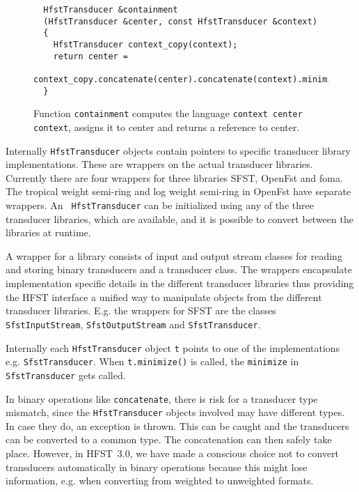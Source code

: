 \documentclass{llncs}
\begin{document}
\begin{figure}
\begin{center}
\begin{verbatim}
  HfstTransducer &containment
  (HfstTransducer &center, const HfstTransducer &context)
  {
    HfstTransducer context_copy(context);
    return center = 
      context_copy.concatenate(center).concatenate(context).minimize();
  }
\end{verbatim}
\caption{Function {\tt containment} computes the language {\tt context center context}, assigns it to center and returns a reference to center.}\label{containment-figure}
\end{center}
\end{figure}

Internally {\tt HfstTransducer} objects contain pointers to specific
transducer library implementations. These are wrappers on the actual
transducer libraries. Currently there are four wrappers for three
libraries SFST, OpenFst and foma. The tropical weight semi-ring and log
weight semi-ring in OpenFst have separate wrappers. An {\tt
  HfstTransducer} can be initialized using any of the three transducer
libraries, which are available, and it is possible to convert between
the libraries at runtime.

A wrapper for a library consists of input and output stream classes
for reading and storing binary transducers and a transducer class. The
wrappers encapsulate implementation specific details in the different
transducer libraries thus providing the HFST interface a unified way
to manipulate objects from the different transducer
libraries. E.g. the wrappers for SFST are the classes {\tt
  SfstInputStream}, {\tt SfstOutputStream} and {\tt SfstTransducer}.

Internally each {\tt HfstTransducer} object {\tt t} points to one of
the implementations e.g. {\tt SfstTransducer}. When {\tt t.minimize()}
is called, the {\tt minimize} in {\tt SfstTransducer} gets called. 

In binary operations like {\tt concatenate}, there is risk for a
transducer type mismatch, since the {\tt HfstTransducer} objects
involved may have different types. In case they do, an exception is
thrown. This can be caught and the transducers can be converted to a
common type. The concatenation can then safely take place. 
However, in HFST~3.0, we have made a conscious choice not to convert transducers
automatically in binary operations because this might lose
information, e.g. when converting from weighted to unweighted formats.
\end{document}

